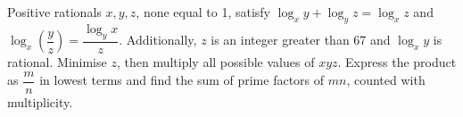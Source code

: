Positive rationals $x,y,z$, none equal to 1, satisfy $\log_xy+\log_yz=\log_xz$ and $\log_x (\dfrac{y}{z}) = \dfrac{\log_y x}{z}$. Additionally, $z$ is an integer greater than 67 and $\log_xy$ is rational. Minimise $z$, then multiply all possible values of $xyz$. Express the product as $\dfrac{m}{n}$ in lowest terms and find the sum of prime factors of $mn$, counted with multiplicity.
